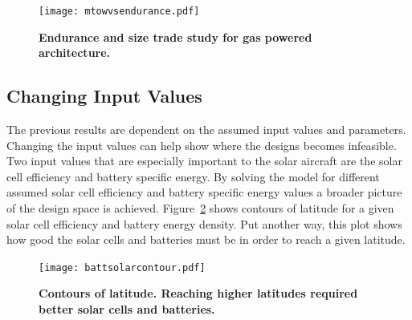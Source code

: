 \begin{figure}[H]
	\begin{center}
	\texttt{[image: mtowvsendurance.pdf]}
    \caption{\textbf{Endurance and size trade study for gas powered architecture.}}
	\label{f:spanvsendurance}
	\end{center}
\end{figure}

% 

\subsection{Changing Input Values}

The previous results are dependent on the assumed input values and parameters.  
Changing the input values can help show where the designs becomes infeasible. 
Two input values that are especially important to the solar aircraft are the solar cell efficiency and battery specific energy. 
By solving the model for different assumed solar cell efficiency and battery specific energy values a broader picture of the design space is achieved.   
Figure~\ref{f:battsolarcontour} shows contours of latitude for a given solar cell efficiency and battery energy density.  Put another way, this plot shows how good the solar cells and batteries must be in order to reach a given latitude. 

\begin{figure}[H]
	\begin{center}
	\texttt{[image: battsolarcontour.pdf]}
    \caption{\textbf{Contours of latitude. Reaching higher latitudes required better solar cells and batteries.}}
	\label{f:battsolarcontour}
	\end{center}
\end{figure}

